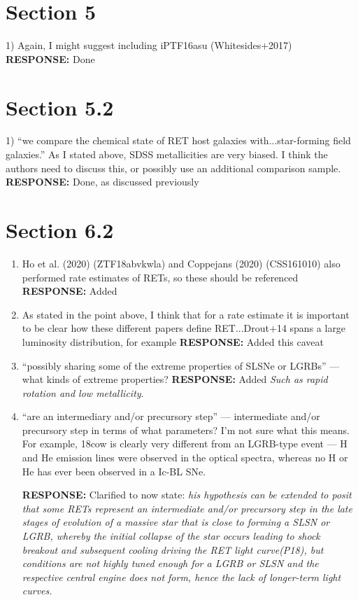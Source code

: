 \documentclass{article}
\begin{document}
\section*{Section 5}
1) Again, I might suggest including iPTF16asu (Whitesides+2017)
 \vskip0.1cm
 {\bf RESPONSE: }Done
 
 \section*{Section 5.2}
 
 1)  “we compare the chemical state of RET host galaxies with...star-forming field galaxies.” As I stated
above, SDSS metallicities are very biased. I think the authors need to discuss this, or possibly use an additional comparison sample.
\vskip0.1cm
 {\bf RESPONSE: } Done, as discussed previously
 
 \section*{Section 6.2}
 \begin{enumerate}
     \item Ho et al. (2020) (ZTF18abvkwla) and Coppejans (2020) (CSS161010) also performed rate estimates of RETs, so these should be referenced
    \vskip0.1cm
 {\bf RESPONSE: }  Added
 \item As stated in the point above, I think that for a rate estimate it is important to be clear how these different papers define RET...Drout+14 spans a large luminosity distribution, for example
\vskip0.1cm
 {\bf RESPONSE: } Added this caveat
 
 \item “possibly sharing some of the extreme properties of SLSNe or LGRBs” — what kinds of extreme properties?
 \vskip0.1cm
 {\bf RESPONSE: } Added \textit{Such as rapid rotation and low metallicity}.
 
 \item “are an intermediary and/or precursory step” — intermediate and/or precursory step in terms of what parameters? I’m not sure what this means. For example, 18cow is clearly very different from an LGRB-type event — H and He emission lines were observed in the optical spectra, whereas no H or He has ever been observed in a Ic-BL SNe.
 
  \vskip0.1cm
 {\bf RESPONSE: } Clarified to now state: \textit{ his hypothesis can be extended to posit that some RETs represent an intermediate and/or precursory step in the late stages of evolution of a massive star that is close to forming a SLSN or LGRB, whereby the initial collapse of the star occurs leading to shock breakout and subsequent cooling driving the RET light curve(P18), but conditions are not highly tuned enough for a LGRB or SLSN and the respective central engine does not form, hence the lack of longer-term light curves.}
     
    
 \end{enumerate}
 
\end{document}
